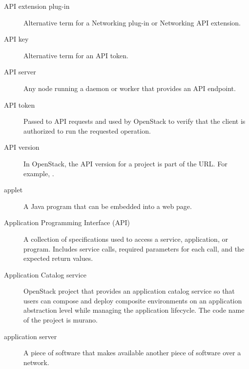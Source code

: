 \documentclass[letterpaper,10pt,english]{sphinxmanual}
\begin{document}
\begin{description}
\item[{API extension plug-in}] \leavevmode{}\label{_source/glossary:term-api-extension-plug-in}
Alternative term for a Networking plug-in or Networking API
extension.

\item[{API key}] \leavevmode{}\label{_source/glossary:term-api-key}
Alternative term for an API token.

\item[{API server}] \leavevmode{}\label{_source/glossary:term-api-server}
Any node running a daemon or worker that provides an API
endpoint.

\item[{API token}] \leavevmode{}\label{_source/glossary:term-api-token}
Passed to API requests and used by OpenStack to verify that the
client is authorized to run the requested operation.

\item[{API version}] \leavevmode{}\label{_source/glossary:term-api-version}
In OpenStack, the API version for a project is part of the URL.
For example, .

\item[{applet}] \leavevmode{}\label{_source/glossary:term-applet}
A Java program that can be embedded into a web page.

\item[{Application Programming Interface (API)}] \leavevmode{}\label{_source/glossary:term-application-programming-interface-api}
A collection of specifications used to access a service,
application, or program. Includes service calls, required parameters
for each call, and the expected return values.

\item[{Application Catalog service}] \leavevmode{}\label{_source/glossary:term-application-catalog-service}
OpenStack project that provides an application catalog
service so that users can compose and deploy composite
environments on an application abstraction level while
managing the application lifecycle. The code name of the
project is murano.

\item[{application server}] \leavevmode{}\label{_source/glossary:term-application-server}
A piece of software that makes available another piece of
software over a network.


\end{description}
\end{document}
